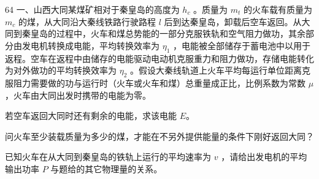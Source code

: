 \begin{problem}[33届物理竞赛决赛]{64}
    一、山西大同某煤矿相对于秦皇岛的高度为 $h_{c}$ 。质量为 $m_{t}$ 的火车载有质量为 $m_{c}$ 的煤，从大同沿大秦线铁路行驶路程 $l$ 后到达秦皇岛，卸载后空车返回。从大同到秦皇岛的过程中，火车和煤总势能的一部分克服铁轨和空气阻力做功，其余部分由发电机转换成电能，平均转换效率为 $\eta_{1}$ ，电能被全部储存于蓄电池中以用于返程。空车在返程中由储存的电能驱动电动机克服重力和阻力做功，存储电能转化为对外做功的平均转换效率为 $\eta_{2}$ 。假设大秦线轨道上火车平均每运行单位距离克服阻力需要做的功与运行时（火车或火车和煤）总重量成正比，比例系数为常数 $\mu$ ，火车由大同出发时携带的电能为零。
    \begin{subproblem}
        若空车返回大同时还有剩余的电能，求该电能 $E$。
    \end{subproblem}
    \begin{subproblem}
        问火车至少装载质量为多少的煤，才能在不另外提供能量的条件下刚好返回大同？
    \end{subproblem}
    \begin{subproblem}
        已知火车在从大同到秦皇岛的铁轨上运行的平均速率为 $v$ ，请给出发电机的平均输出功率 $P$ 与题给的其它物理量的关系。
    \end{subproblem}
\end{problem}